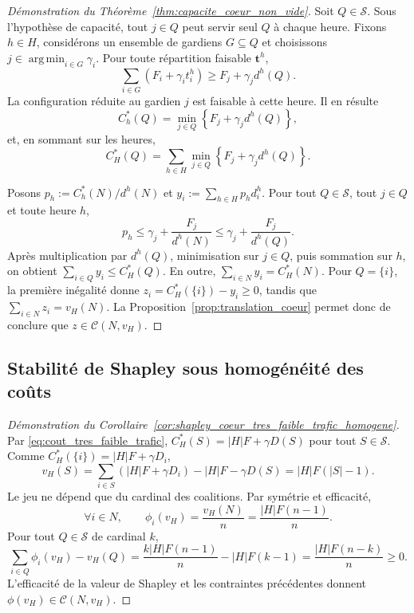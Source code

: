 \begin{proof}[Démonstration du Théorème~\ref{thm:capacite_coeur_non_vide}]
Soit \(Q\in\mathcal S\). Sous l'hypothèse de capacité,
tout \(j\in Q\) peut servir seul \(Q\) à chaque heure. Fixons \(h\in H\),
considérons un ensemble de gardiens \(G\subseteq Q\) et choisissons
\(j\in\operatorname*{arg\,min}_{i\in G}\gamma_i\). Pour toute répartition
faisable \(\mathbf t^h\),
\[
    \sum_{i\in G}\left(F_i+\gamma_i t_i^h\right)
    \geqslant F_j+\gamma_jd^h(Q).
\]
La configuration réduite au gardien \(j\) est faisable à cette heure. Il en
résulte
\[
    C_h^*(Q)=\min_{j\in Q}\left\{F_j+\gamma_jd^h(Q)\right\},
\]
et, en sommant sur les heures,
\begin{equation}
    C_H^*(Q)
    =\sum_{h\in H}\min_{j\in Q}
      \left\{F_j+\gamma_jd^h(Q)\right\}.
    \label{eq:cout_tres_faible_trafic}
\end{equation}

Posons \(p_h:=C_h^*(N)/d^h(N)\) et
\(y_i:=\sum_{h\in H}p_hd_i^h\). Pour tout \(Q\in\mathcal S\), tout
\(j\in Q\) et toute heure \(h\),
\[
    p_h
    \leqslant
    \gamma_j+\frac{F_j}{d^h(N)}
    \leqslant
    \gamma_j+\frac{F_j}{d^h(Q)}.
\]
Après multiplication par \(d^h(Q)\), minimisation sur \(j\in Q\), puis
sommation sur \(h\), on obtient
\(\sum_{i\in Q}y_i\leqslant C_H^*(Q)\). En outre,
\(\sum_{i\in N}y_i=C_H^*(N)\). Pour \(Q=\{i\}\), la première inégalité
donne \(z_i=C_H^*(\{i\})-y_i\geqslant0\), tandis que
\(\sum_{i\in N}z_i=v_H(N)\). La
Proposition~\ref{prop:translation_coeur} permet donc de conclure que
\(z\in\mathcal C(N,v_H)\).
\end{proof}

\subsection{Stabilité de Shapley sous homogénéité des coûts}
\label{app:preuve_shapley_homogene}

\begin{proof}[Démonstration du Corollaire~\ref{cor:shapley_coeur_tres_faible_trafic_homogene}]
Par \eqref{eq:cout_tres_faible_trafic},
\(C_H^*(S)=|H|F+\gamma D(S)\) pour tout \(S\in\mathcal S\). Comme
\(C_H^*(\{i\})=|H|F+\gamma D_i\),
\[
    v_H(S)
    =\sum_{i\in S}(|H|F+\gamma D_i)-|H|F-\gamma D(S)
    =|H|F(|S|-1).
\]
Le jeu ne dépend que du cardinal des coalitions. Par symétrie et efficacité,
\[
    \forall i\in N,\qquad
    \phi_i(v_H)=\frac{v_H(N)}{n}=\frac{|H|F(n-1)}{n}.
\]
Pour tout \(Q\in\mathcal S\) de cardinal \(k\),
\[
    \sum_{i\in Q}\phi_i(v_H)-v_H(Q)
    =\frac{k|H|F(n-1)}{n}-|H|F(k-1)
    =\frac{|H|F(n-k)}{n}
    \geqslant0.
\]
L'efficacité de la valeur de Shapley et les contraintes précédentes donnent
\(\phi(v_H)\in\mathcal C(N,v_H)\).
\end{proof}

